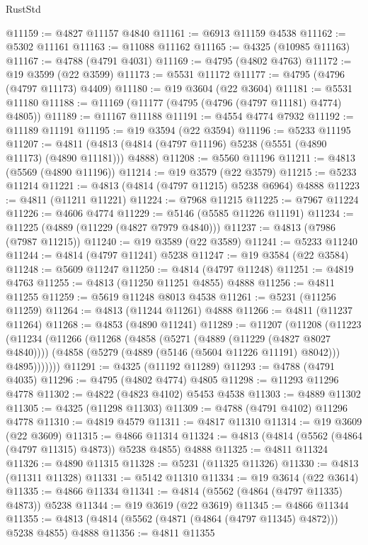 \begin{lexlean}{RustStd}
\begin{coremodule}
@11159 := @4827 @11157 @4840
@11161 := @6913 @11159 @4538
@11162 := @5302 @11161
@11163 := @11088 @11162
@11165 := @4325 (@10985 @11163)
@11167 := @4788 (@4791 @4031)
@11169 := @4795 (@4802 @4763)
@11172 := @19 @3599 (@22 @3599)
@11173 := @5531 @11172
@11177 := @4795 (@4796 (@4797 @11173) @4409)
@11180 := @19 @3604 (@22 @3604)
@11181 := @5531 @11180
@11188 := @11169 (@11177 (@4795 (@4796 (@4797 @11181) @4774) @4805))
@11189 := @11167 @11188
@11191 := @4554 @4774 @7932
@11192 := @11189 @11191
@11195 := @19 @3594 (@22 @3594)
@11196 := @5233 @11195
@11207 := @4811 (@4813 (@4814 (@4797 @11196) @5238 (@5551 (@4890 @11173) (@4890 @11181))) @4888)
@11208 := @5560 @11196
@11211 := @4813 (@5569 (@4890 @11196))
@11214 := @19 @3579 (@22 @3579)
@11215 := @5233 @11214
@11221 := @4813 (@4814 (@4797 @11215) @5238 @6964) @4888
@11223 := @4811 (@11211 @11221)
@11224 := @7968 @11215
@11225 := @7967 @11224
@11226 := @4606 @4774
@11229 := @5146 (@5585 @11226 @11191)
@11234 := @11225 (@4889 (@11229 (@4827 @7979 @4840)))
@11237 := @4813 (@7986 (@7987 @11215))
@11240 := @19 @3589 (@22 @3589)
@11241 := @5233 @11240
@11244 := @4814 (@4797 @11241) @5238
@11247 := @19 @3584 (@22 @3584)
@11248 := @5609 @11247
@11250 := @4814 (@4797 @11248)
@11251 := @4819 @4763
@11255 := @4813 (@11250 @11251 @4855) @4888
@11256 := @4811 @11255
@11259 := @5619 @11248 @8013 @4538
@11261 := @5231 (@11256 @11259)
@11264 := @4813 (@11244 @11261) @4888
@11266 := @4811 (@11237 @11264)
@11268 := @4853 (@4890 @11241)
@11289 := @11207
    (@11208
      (@11223
        (@11234
          (@11266
            (@11268
              (@4858
                (@5271 (@4889 (@11229 (@4827 @8027 @4840))))
                (@4858 (@5279 (@4889 (@5146 (@5604 @11226 @11191) @8042))) @4895)))))))
@11291 := @4325 (@11192 @11289)
@11293 := @4788 (@4791 @4035)
@11296 := @4795 (@4802 @4774) @4805
@11298 := @11293 @11296 @4778
@11302 := @4822 (@4823 @4102) @5453 @4538
@11303 := @4889 @11302
@11305 := @4325 (@11298 @11303)
@11309 := @4788 (@4791 @4102) @11296 @4778
@11310 := @4819 @4579
@11311 := @4817 @11310
@11314 := @19 @3609 (@22 @3609)
@11315 := @4866 @11314
@11324 := @4813 (@4814 (@5562 (@4864 (@4797 @11315) @4873)) @5238 @4855) @4888
@11325 := @4811 @11324
@11326 := @4890 @11315
@11328 := @5231 (@11325 @11326)
@11330 := @4813 (@11311 @11328)
@11331 := @5142 @11310
@11334 := @19 @3614 (@22 @3614)
@11335 := @4866 @11334
@11341 := @4814 (@5562 (@4864 (@4797 @11335) @4873)) @5238
@11344 := @19 @3619 (@22 @3619)
@11345 := @4866 @11344
@11355 := @4813 (@4814 (@5562 (@4871 (@4864 (@4797 @11345) @4872))) @5238 @4855) @4888
@11356 := @4811 @11355

\end{coremodule}
\end{lexlean}
